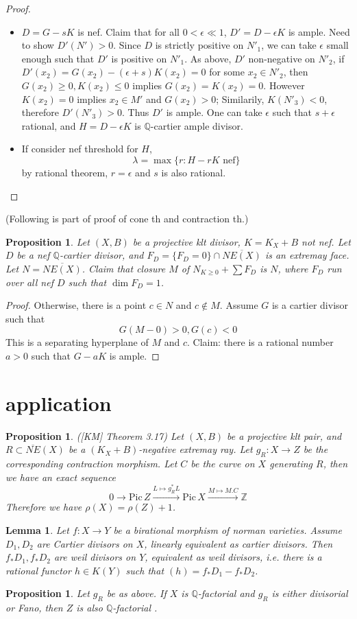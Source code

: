 \documentclass{article}
\newtheorem{prop}[defn]{Proposition}
\newtheorem{lem}[defn]{Lemma}
\begin{document}
\begin{proof}
\begin{itemize}
		\item $ D=G-sK $ is nef. Claim that for all $ 0<\epsilon \ll 1 $, $ D'=D-\epsilon K $ is ample. Need to show $ D'(N')>0 $. Since $ D $ is strictly positive on $ N'_1 $, we can take $ \epsilon $ small enough such that $ D' $ is positive on $ N'_1 $. As above, $ D' $ non-negative on $ N'_2 $, if $ D'(x_2)=G(x_2)-(\epsilon +s)K(x_2)=0$ for some $ x_2\in N'_2 $, then $ G(x_2)\geqslant 0,K(x_2)\leqslant 0 $ implies $ G(x_2)=K(x_2)=0 $. However $ K(x_2)=0 $ implies $ x_2\in M' $ and $ G(x_2)>0 $;  Similarily, $ K(N'_3)<0 $, therefore $ D'(N'_3)>0 $. Thus $ D' $ is ample. One can take $ \epsilon $ such that $ s+\epsilon $ rational, and $ H=D-\epsilon K $ is $ \mathbb{Q} $-cartier ample divisor.
		\item If consider nef threshold for $ H $,
		$$ \lambda=\max\{r: H-rK \text{ nef}\} $$
		by rational theorem, $ r=\epsilon $ and $ s $ is also rational.
	\end{itemize}
	
	
	
\end{proof}


(Following is part of proof of cone th and contraction th.)
\begin{prop}
	Let $ (X,B) $ be a projective klt divisor, $ K=K_X+B $ not nef.	Let $ D $ be a nef $ \mathbb{Q} $-cartier divisor, and $ F_D=\{F_D=0\}\cap \overline{NE(X)} $ is an extremay face. Let $ N=\overline{NE(X)} $. Claim that closure $ M $ of $ N_{K\geqslant 0}+\sum F_D $
	is $ N $, where $ F_D $ run over all nef $ D $ such that $ \dim F_D=1 $. 
\end{prop}
\begin{proof}
	Otherwise, there is a point $ c\in N $ and $ c\notin M  $. Assume $ G $ is a cartier divisor such that 
	$$ G(M-0)>0,G(c)<0 $$
	This is a separating hyperplane of $ M $ and $ c $. Claim: there is a rational number $ a>0 $ such that $ G-aK $ is ample.
\end{proof}



\section{application}
\begin{prop}
	([KM] Theorem 3.17) Let $ (X,B) $ be a projective klt pair, and $ R\subset \overline{NE}(X) $ be a $ (K_X+B) $-negative extremay ray. Let $ g_R:X\to Z $ be the corresponding contraction morphism. Let $ C $ be the curve on $ X $ generating $ R $, then we have an exact sequence
	$$ 0\to \mathrm{Pic}\,Z\xrightarrow{L\mapsto g_R^*L}\mathrm{Pic}\,X\xrightarrow{M\mapsto M.C} \mathbb{Z} $$
	Therefore we have $ \rho(X)=\rho(Z)+1 $. 
\end{prop}
\begin{lem}
	Let $ f:X\to Y $ be a birational morphism of norman varieties. Assume $ D_1,D_2 $ are  Cartier divisors on $ X $, linearly equivalent as cartier divisors. Then $ f_*D_1,f_*D_2 $ are weil divisors on $ Y $, equivalent as weil divisors, i.e. there is a rational functor $ h\in K(Y) $ such that $ (h)= f_*D_1-f_*D_2$.
\end{lem}

\begin{prop}
	Let $ g_R $ be as above. If $ X $ is $ \mathbb{Q} $-factorial and $ g_R $ is either divisorial or Fano, then $ Z $ is also   $\mathbb{Q} $-factorial .
\end{prop}
\end{document}
